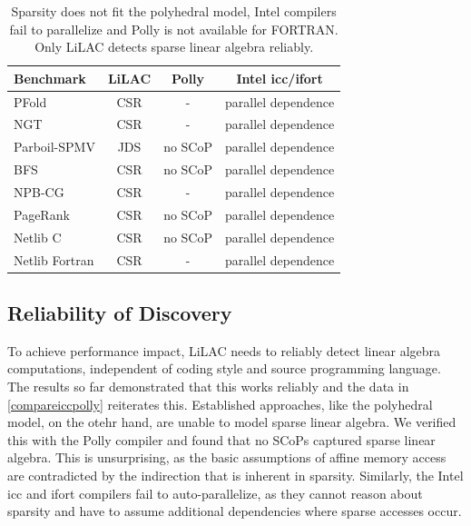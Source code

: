 \begin{table}[b]
\centering
\caption{Sparsity does not fit the polyhedral model, Intel compilers fail to
         parallelize and Polly is not available for FORTRAN.
         Only LiLAC detects sparse linear algebra reliably.}
\label{compareiccpolly}
\vspace{-0.5em}
\small
\begin{tabular}{l|c|c|c}
{\bf Benchmark}      & {\bf LiLAC}    & {\bf Polly}   & {\bf Intel icc/ifort} \\
\hline
\hline
PFold          & CSR & - & parallel dependence \\[-0.3em]
NGT            & CSR & - & parallel dependence \\[-0.3em]
Parboil-SPMV   & JDS & no SCoP & parallel dependence \\[-0.3em]
BFS            & CSR & no SCoP & parallel dependence \\[-0.3em]
NPB-CG         & CSR & - & parallel dependence \\[-0.3em]
PageRank       & CSR & no SCoP & parallel dependence \\[-0.3em]
Netlib C       & CSR & no SCoP & parallel dependence \\[-0.3em]
Netlib Fortran & CSR & - & parallel dependence \\
\end{tabular}
\end{table}

\subsection{Reliability of Discovery}

    To achieve performance impact, LiLAC needs to reliably detect linear algebra
    computations, independent of coding style and source programming language.
    The results so far demonstrated that this works reliably and the data in
    \autoref{compareiccpolly} reiterates this.
    Established approaches, like the polyhedral model, on the otehr hand, are
    unable to model sparse linear algebra.
    We verified this with the Polly compiler and found that no SCoPs captured
    sparse linear algebra.
    This is unsurprising, as the basic assumptions of affine memory access are
    contradicted by the indirection that is inherent in sparsity.
    Similarly, the Intel icc and ifort compilers fail to auto-parallelize, as
    they cannot reason about sparsity and have to assume additional dependencies
    where sparse accesses occur.

